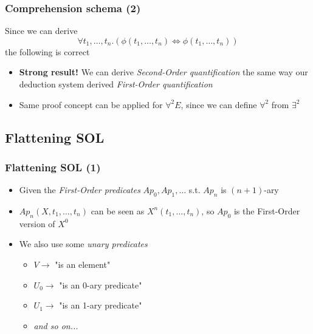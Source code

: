 \documentclass{beamer}
\newenvironment{proofidea}{
    \renewcommand{\proofname}{Proof idea.}\proof
}{\endproof}
\begin{document}
                \begin{frame}
                    \frametitle{Comprehension schema (2)}
                    \begin{proofidea}
                        Since we can derive
                        \[
                            \forall t_1, \dots, t_n.(\phi(t_1, \dots, t_n) \Leftrightarrow \phi(t_1, \dots, t_n))    
                        \]
                        the following is correct
                        \begin{prooftree}
                        \end{prooftree}
                    \end{proofidea}
                    \begin{itemize}
                        \item \textbf{Strong result!} We can derive \textit{Second-Order quantification} the same way our deduction system derived \textit{First-Order quantification}
                        \item Same proof concept can be applied for $ \forall^2E $, since we can define $ \forall^2 $ from $ \exists^2 $ 
                    \end{itemize}
                \end{frame}

            \subsection{Flattening SOL}
                \begin{frame}
                    \frametitle{Flattening SOL (1)}
                    \begin{itemize}
                        \item Given the \textit{First-Order predicates} $ Ap_0, Ap_1, \dots $ s.t. $ Ap_n $ is $ (n + 1) $-ary
                        \item $ Ap_n(X, t_1, \dots, t_n) $ can be seen as $ X^n(t_1, \dots, t_n) $, so $ Ap_0 $ is the First-Order version of $ X^0 $
                        \item We also use some \textit{unary predicates}
                              \begin{itemize}
                                \item $ V \rightarrow $ "is an element"
                                \item $ U_0 \rightarrow $ "is an 0-ary predicate"
                                \item $ U_1 \rightarrow $ "is an 1-ary predicate"
                                \item \textit{and so on...}
                              \end{itemize}
                    \end{itemize}
                \end{frame}
\end{document}
